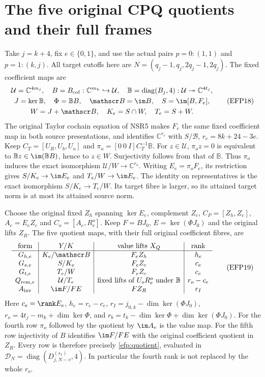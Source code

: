 \documentclass[11pt,a4paper]{article}
\providecommand{\C}{\mathbb C}
\begin{document}
\section{The five original CPQ quotients and their full frames}
Take $j=k+4$, fix $e\in\{0,1\}$, and use the actual pairs
$p=0:(1,1)$ and $p=1:(k,j)$.
All target cutoffs here are
$N=(q_j-1,q_j,2q_j-1,2q_j)$.
The fixed coefficient maps are
\[
\begin{gathered}
\mathcal U=\C^{4m_j},\quad B=B_{\rm cof}:\C^{m_k}\hookrightarrow\mathcal U,
\quad\mathbb B=\operatorname{diag}(B_j,4):
 \mathcal U\twoheadrightarrow\C^{4t_j},\\
J=\ker\mathbb B,\quad \Phi=\mathbb BB,\quad
\mathscr B=\im B,\quad S=\im[B,F_e],\\
W=J+\mathscr B,\quad K_e=S\cap W,\quad T_e=S+W .
\end{gathered}\tag{EFP18}\label{efp:flags}
\]
The original Taylor cochain equation of NSR5 makes $F_e$ the same
fixed coefficient map in both source presentations, and identifies
$\C^{r_e}$ with $S/\mathscr B$, $r_e=8k+24-3e$.
Keep $C_T=[U_R,U_b,U_o]$ and
$\pi_o=[0\ 0\ I]C_T^{-1}\mathbb B$.
For $z\in\mathcal U$, $\pi_oz=0$ is equivalent to
$\mathbb Bz\in\im(\mathbb BB)$, hence to $z\in W$.
Surjectivity follows from that of $\mathbb B$.
Thus $\pi_o$ induces the exact isomorphism
$\mathcal U/W\to\C^{r_o}$.
Writing $E_e=\pi_oF_e$, its restriction gives
$S/K_e\to\im E_e$ and $T_e/W\to\im E_e$.
The identity on representatives is the exact isomorphism
$S/K_e\to T_e/W$. Its target fibre is larger, so its attained
target norm is at most its attained source norm.

Choose the original fixed $Z_h$ spanning $\ker E_e$, complement $Z_c$,
$C_P=[Z_h,Z_c]$, $A_e=E_eZ_c$ and $C_o=[A_e,R_e^o]$.
Keep $F=BJ_0$, $E=\ker(\Phi J_0)$ and the original lifts $Z_R$.
The five quotient maps, with their full original coefficient fibres,
are
\[
\begin{array}{c|c|c|c}
\text{form}&Y/K&\text{value lifts }X_Q&\text{rank}\\ \hline
G_{h,e}&K_e/\mathscr B&F_eZ_h&h_e\\
G_{s,e}&S/K_e&F_eZ_c&c_e\\
G_{t,e}&T_e/W&F_eZ_c&c_e\\
Q_{{\rm rem},e}&\mathcal U/T_e&
   \text{fixed lifts of }U_oR_e^o\text{ under }\mathbb B&r_o-c_e\\
A_{\rm inv}&\im F/FE&FZ_R&r_I
\end{array}\tag{EFP19}\label{efp:five}
\]
Here $c_e=\rank E_e$, $h_e=r_e-c_e$,
$r_I=j_{0,k}-\dim\ker(\Phi J_0)$,
$r_o=4t_j-m_k+\dim\ker\Phi$, and
$r_b=t_k-\dim\ker\Phi+\dim\ker(\Phi J_0)$.
For the fourth row $\pi_o$ followed by the quotient by $\im A_e$
is the value map. For the fifth row injectivity of $B$ identifies
$\im F/FE$ with the original coefficient quotient in $Z_R$.
Every row is therefore precisely \eqref{efp:quotient}, evaluated in
$\mathcal D_N=\operatorname{diag}(D_{j,N-v}^{(s_1)},4)$.
In particular the fourth rank is not replaced by the whole $r_o$.
\end{document}
